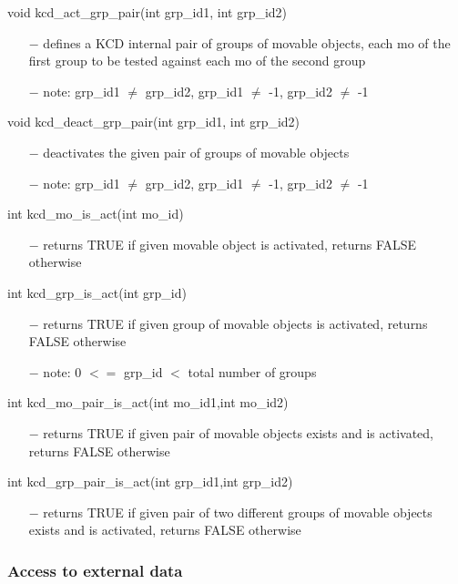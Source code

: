 void kcd\_act\_grp\_pair(int grp\_id1, int grp\_id2)
\begin{itemize}
\item[$-$] defines a KCD internal pair of groups of movable objects, each mo of
  the first group to be tested against each mo of the second group
\item[$-$] note: grp\_id1 $\neq$ grp\_id2, grp\_id1 $\neq$ -1, grp\_id2 $\neq$ -1
\end{itemize}
void kcd\_deact\_grp\_pair(int grp\_id1, int grp\_id2)
\begin{itemize}
\item[$-$] deactivates the given pair of groups of movable objects
\item[$-$] note: grp\_id1 $\neq$ grp\_id2, grp\_id1 $\neq$ -1, grp\_id2 $\neq$ -1
\end{itemize}
int kcd\_mo\_is\_act(int mo\_id)
\begin{itemize}
\item[$-$] returns TRUE if given movable object is activated, 
  returns FALSE otherwise
\end{itemize}
int kcd\_grp\_is\_act(int grp\_id)
\begin{itemize}
\item[$-$] returns TRUE if given group of movable objects is activated, 
  returns FALSE otherwise
\item[$-$] note: 0 $<=$ grp\_id $<$ total number of groups
\end{itemize}
int kcd\_mo\_pair\_is\_act(int mo\_id1,int mo\_id2)
\begin{itemize}
\item[$-$] returns TRUE if given pair of movable objects exists and is activated, 
  returns FALSE otherwise
\end{itemize}
int kcd\_grp\_pair\_is\_act(int grp\_id1,int grp\_id2)
\begin{itemize}
\item[$-$] returns TRUE if given pair of two different groups of movable objects exists 
  and is activated, returns FALSE otherwise
\end{itemize}

\subsubsection{Access to external data}

